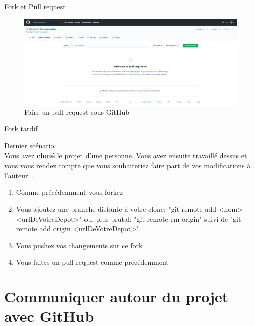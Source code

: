 \documentclass{beamer}
\begin{document}
\begin{frame}{Fork et Pull request}
\begin{figure}[h!]
    \includegraphics[scale=0.15]{images/droits_push/pull_request.png}
    \caption{Faire un pull request sous GitHub}
\end{figure}
\end{frame}


\begin{frame}{Fork tardif}

\underline{Dernier scénario:}\\
\smallskip
Vous avez \textbf{cloné} le projet d'une personne. Vous avez ensuite travaillé dessus et vous vous rendez compte que vous souhaiteriez faire part de vos modifications à l'auteur...\\
\medskip

\begin{enumerate}
    \item Comme précédemment vous forkez
    \item Vous ajoutez une branche distante à votre clone: "git remote add <nom> <urlDeVotreDepot>" ou, plus brutal: "git remote rm origin" suivi de "git remote add origin <urlDeVotreDepot>"
    \item Vous pushez vos changements sur ce fork
    \item Vous faites un pull request comme précédemment
\end{enumerate}
\end{frame}






\section{Communiquer autour du projet avec GitHub}
\end{document}
